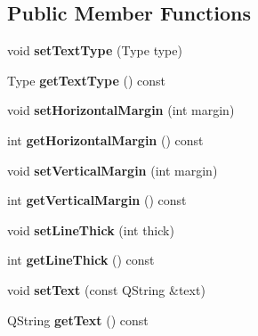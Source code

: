\subsection*{Public Member Functions}
\begin{DoxyCompactItemize}
\item 
\mbox{\label{class_o_v_e_1_1_text_aa9724d33ae7d0b372f79b40d54d1a94d}} 
void {\bfseries set\+Text\+Type} (Type type)
\item 
\mbox{\label{class_o_v_e_1_1_text_a646e0de1f1081f1226e4acc99ff46f3f}} 
Type {\bfseries get\+Text\+Type} () const
\item 
\mbox{\label{class_o_v_e_1_1_text_a7b56f21eb6cd86fa7aa17ef213564db0}} 
void {\bfseries set\+Horizontal\+Margin} (int margin)
\item 
\mbox{\label{class_o_v_e_1_1_text_a4a7c1751653a87ad78ce494b2666f539}} 
int {\bfseries get\+Horizontal\+Margin} () const
\item 
\mbox{\label{class_o_v_e_1_1_text_ad98a9b639ce73b3c5704c39076564d9c}} 
void {\bfseries set\+Vertical\+Margin} (int margin)
\item 
\mbox{\label{class_o_v_e_1_1_text_af6f6ceb0b4c50c106c1939324996ec58}} 
int {\bfseries get\+Vertical\+Margin} () const
\item 
\mbox{\label{class_o_v_e_1_1_text_ad8e2c14fb6773b2d0c8efaea97d01d01}} 
void {\bfseries set\+Line\+Thick} (int thick)
\item 
\mbox{\label{class_o_v_e_1_1_text_a6398645761a35cf7f075de4fb0acf0c2}} 
int {\bfseries get\+Line\+Thick} () const
\item 
\mbox{\label{class_o_v_e_1_1_text_a2ea3ee4b1aaef5849c7b67d3fdc7f0cf}} 
void {\bfseries set\+Text} (const Q\+String \&text)
\item 
\mbox{\label{class_o_v_e_1_1_text_abe163ec00700b6270df2ea85de0e1df6}} 
Q\+String {\bfseries get\+Text} () const
\item 

\end{DoxyCompactItemize}
